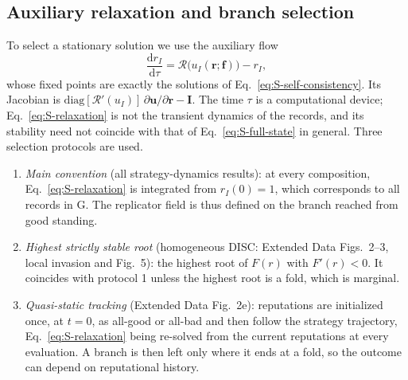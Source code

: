 \documentclass[fleqn,10pt]{article}
\theoremstyle{plain}
\theoremstyle{remark}
\newcommand{\FigOpportunism}{5}
\newcommand{\EDResident}{2}
\newcommand{\EDPlanes}{3}
\newcommand{\Rm}{\mathcal R}
\newcommand{\G}{\mathrm G}
\begin{document}
\subsection{Auxiliary relaxation and branch selection}
To select a stationary solution we use the auxiliary flow
\begin{equation}
\frac{\mathrm dr_I}{\mathrm d\tau}=\Rm\bigl(u_I(\boldsymbol r;\boldsymbol f)\bigr)-r_I,
\label{eq:S-relaxation}
\end{equation}
whose fixed points are exactly the solutions of
Eq.~\eqref{eq:S-self-consistency}. Its Jacobian is
$\mathrm{diag}[\Rm'(u_I)]\,\partial\boldsymbol u/\partial\boldsymbol r-\mathbf I$. The
time $\tau$ is a computational device; Eq.~\eqref{eq:S-relaxation} is not the
transient dynamics of the records, and its stability need not coincide with
that of Eq.~\eqref{eq:S-full-state} in general. Three selection protocols are
used.
\begin{enumerate}
\item \emph{Main convention} (all strategy-dynamics results): at every
composition, Eq.~\eqref{eq:S-relaxation} is integrated from $r_I(0)=1$, which
corresponds to all records in $\G$. The replicator field is thus defined on the
branch reached from good standing.
\item \emph{Highest strictly stable root} (homogeneous DISC: Extended Data
Figs.~\EDResident--\EDPlanes, local invasion and Fig.~\FigOpportunism): the
highest root of $F(r)$ with $F'(r)<0$. It coincides with protocol 1 unless the
highest root is a fold, which is marginal.
\item \emph{Quasi-static tracking} (Extended Data Fig.~\EDResident e):
reputations are initialized once, at $t=0$, as all-good or all-bad and then
follow the strategy trajectory, Eq.~\eqref{eq:S-relaxation} being re-solved from
the current reputations at every evaluation. A branch is then left only where it
ends at a fold, so the outcome can depend on reputational history.
\end{enumerate}
\end{document}
